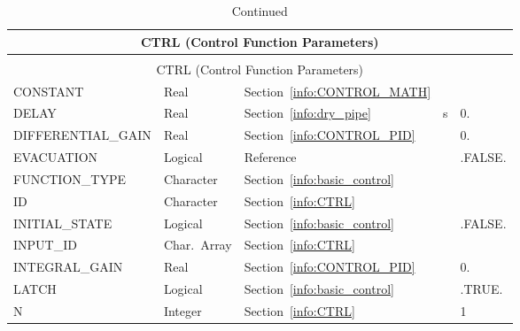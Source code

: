 \documentclass[11pt]{book}
\begin{document}
\begin{longtable}{@{\extracolsep{\fill}}|l|l|l|l|l|}
\caption[Control function parameters ({\ct CTRL} namelist group)]{For more information see Section~\ref{info:CTRL}.}
\label{tbl:CTRL} \\
\hline
\multicolumn{5}{|c|}{{\ct CTRL} (Control Function Parameters)} \\
\hline \hline
\endfirsthead
\caption[]{Continued} \\
\hline
\multicolumn{5}{|c|}{{\ct CTRL} (Control Function Parameters)} \\
\hline \hline
\endhead
{\ct CONSTANT}            & Real       & Section~\ref{info:CONTROL_MATH}         &    &                        \\ \hline
{\ct DELAY}              & Real        & Section~\ref{info:dry_pipe}             & s  &  0.                    \\ \hline
{\ct DIFFERENTIAL\_GAIN} & Real        & Section~\ref{info:CONTROL_PID}          &    &  0.                    \\ \hline
{\ct EVACUATION}         & Logical     & Reference~\cite{FDS_Evac_Users_Guide}   &    & {\ct .FALSE.}          \\ \hline
{\ct FUNCTION\_TYPE}     & Character   & Section~\ref{info:basic_control}        &    &                        \\ \hline
{\ct ID}                 & Character   & Section~\ref{info:CTRL}                 &    &                        \\ \hline
{\ct INITIAL\_STATE}     & Logical     & Section~\ref{info:basic_control}        &    & {\ct .FALSE.}          \\ \hline
{\ct INPUT\_ID}          & Char.~Array & Section~\ref{info:CTRL}                 &    &                        \\ \hline
{\ct INTEGRAL\_GAIN}     & Real        & Section~\ref{info:CONTROL_PID}          &    &  0.                    \\ \hline
{\ct LATCH}              & Logical     & Section~\ref{info:basic_control}        &    & {\ct .TRUE.}           \\ \hline
{\ct N}                  & Integer     & Section~\ref{info:CTRL}                 &    &   1                    \\ \hline

\end{longtable}
\end{document}

